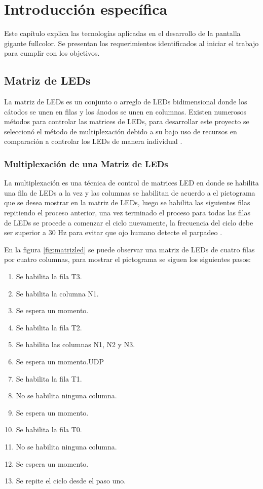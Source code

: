 \chapter{Introducción específica} %

\label{Chapter2}

Este capítulo explica las tecnologías aplicadas en el desarrollo de la pantalla gigante fullcolor. Se presentan los requerimientos identificados al iniciar el trabajo para cumplir con los objetivos.
\section{Matriz de LEDs}
La matriz de LEDs es un conjunto o arreglo de LEDs  bidimensional donde los cátodos se unen en filas y los ánodos se unen en columnas. Existen numerosos métodos para controlar las matrices de LEDs, para desarrollar este proyecto se seleccionó el método de multiplexación debido a su bajo uso de recursos en comparación a controlar los LEDs de manera individual \citep{CONCEPTOMATRIZ}.
\subsection{Multiplexación de una Matriz de LEDs }
La multiplexación es una técnica de control de matrices LED en donde se habilita una fila de LEDs a la vez y las columnas se habilitan de acuerdo a el pictograma que se desea mostrar en la matriz de LEDs, luego se habilita las siguientes filas repitiendo el proceso anterior, una vez terminado el proceso para todas las filas de LEDs se procede a comenzar el ciclo nuevamente, la frecuencia del ciclo debe ser superior a 30 Hz para evitar que ojo humano detecte el parpadeo \citep{MULTIPLEXADO}.

En la figura \ref{fig:matrizled} se puede observar una matriz de LEDs de cuatro filas por cuatro columnas, para mostrar el pictograma se siguen los siguientes pasos:

\begin{enumerate}
\item Se habilita la fila T3.
\item Se habilita la columna N1.
\item Se espera un momento.
\item Se habilita la fila T2.
\item Se habilita las columnas N1, N2 y N3.
\item Se espera un momento.UDP
\item Se habilita la fila T1.
\item No se habilita ninguna columna.
\item Se espera un momento.
\item Se habilita la fila T0.
\item No se habilita ninguna columna.
\item Se espera un momento.
\item Se repite el ciclo desde el paso uno.
\end{enumerate}


